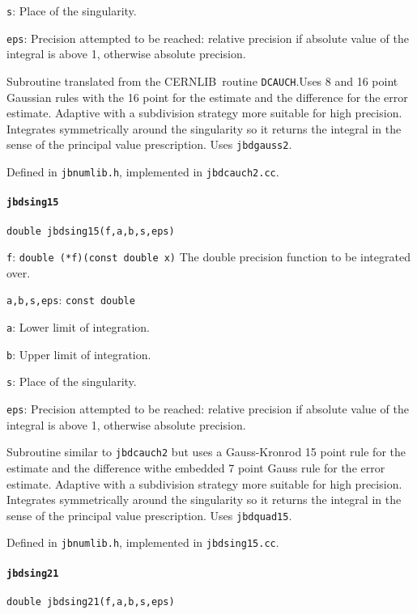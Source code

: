 \documentclass[12pt,a4paper]{article}
\newcommand{\mytt}[1]{\texttt{#1}}
\newcommand{\newfunction}[1]{\mytt{#1}\index{\mytt{#1}}}
\newcommand{\cernlib}{\textsc{CERNLIB}\cite{cernlib}}
\begin{document}
\mytt{s}: Place of the singularity.

\mytt{eps}: Precision attempted to be reached: relative precision if absolute
value of the integral is above 1, otherwise absolute precision.

Subroutine translated from the \cernlib\ routine \mytt{DCAUCH}.Uses
8 and 16 point Gaussian rules with the 16 point for the estimate
and the difference for the error estimate. Adaptive with a subdivision strategy
more suitable for high precision.
Integrates symmetrically around
the singularity so it returns the integral in the sense of the
principal value prescription. Uses \mytt{jbdgauss2}.

Defined in \mytt{jbnumlib.h}, implemented in \mytt{jbdcauch2.cc}.

\paragraph{\newfunction{jbdsing15}}

\mytt{double jbdsing15(f,a,b,s,eps)}

\mytt{f}: \mytt{double (*f)(const double x)} The double precision
function to be integrated over.

\mytt{a,b,s,eps}: \mytt{const double}

\mytt{a}: Lower limit of integration.

\mytt{b}: Upper limit of integration.

\mytt{s}: Place of the singularity.

\mytt{eps}: Precision attempted to be reached: relative precision if absolute
value of the integral is above 1, otherwise absolute precision.

Subroutine similar to \mytt{jbdcauch2}
but uses a Gauss-Kronrod 15 point rule for the estimate
and the difference withe embedded 7 point Gauss rule for the error estimate.
Adaptive with a subdivision strategy
more suitable for high precision.
Integrates symmetrically around
the singularity so it returns the integral in the sense of the
principal value prescription. Uses \mytt{jbdquad15}.

Defined in \mytt{jbnumlib.h}, implemented in \mytt{jbdsing15.cc}.

\paragraph{\newfunction{jbdsing21}}

\mytt{double jbdsing21(f,a,b,s,eps)}
\end{document}
